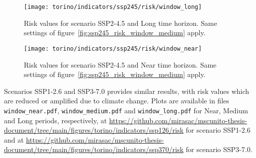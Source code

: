 \begin{figure}
  \centering
  \texttt{[image: torino/indicators/ssp245/risk/window\_long]}
  \caption{Risk values for scenario SSP2-4.5 and Long time horizon. Same settings of figure~\ref{fig:ssp245_risk_window_medium} apply.}
  \label{fig:ssp245_risk_window_long}
\end{figure}

\begin{figure}
  \centering
  \texttt{[image: torino/indicators/ssp245/risk/window\_near]}
  \caption{Risk values for scenario SSP2-4.5 and Near time horizon. Same settings of figure~\ref{fig:ssp245_risk_window_medium} apply.}
  \label{fig:ssp245_risk_window_near}
\end{figure}

Scenarios SSP1-2.6 and SSP3-7.0 provides similar results, with risk values which are reduced or amplified due to climate change. Plots are available in files \verb|window_near.pdf|, \verb|window_medium.pdf| and \verb|window_long.pdf| for Near, Medium and Long periods, respectively, at \url{https://github.com/mirasac/mscunito-thesis-document/tree/main/figures/torino/indicators/ssp126/risk} for scenario SSP1-2.6 and at \url{https://github.com/mirasac/mscunito-thesis-document/tree/main/figures/torino/indicators/ssp370/risk} for scenario SSP3-7.0.
